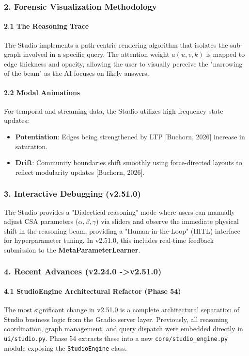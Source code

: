 \subsubsection{2. Forensic Visual\-ization Methodology}

\paragraph{2.1 The Reasoning Trace}
The Studio implements a path-centric rendering algorithm that isolates the sub-graph involved in a specific query. The attention weight $a(u,v,k)$ is mapped to edge thickness and opacity, allowing the user to visually perceive the "narrowing of the beam" as the AI focuses on likely answers.

\paragraph{2.2 Modal Animations}
For temporal and streaming data, the Studio utilizes high-frequency state updates:
\begin{itemize}
\item \textbf{Potent\-iation}: Edges being stren\-gthened by LTP [Buchorn, 2026] increase in saturation.
\item \textbf{Drift}: Community boundaries shift smoothly using force-directed layouts to reflect modularity updates [Buchorn, 2026].

\end{itemize}
\subsubsection{3. Interactive Debugging (v2.51.0)}
The Studio provides a "Dialectical reasoning" mode where users can manually adjust CSA parameters ($\alpha, \beta, \gamma$) via sliders and observe the immediate physical shift in the reasoning beam, providing a "Human-in-the-Loop" (HITL) interface for hyper\-parameter tuning. In v2.51.0, this includes real-time feedback submission to the \textbf{MetaParameterLearner}.

\subsubsection{4. Recent Advances (v2.24.0 -\textgreater  v2.51.0)}

\paragraph{4.1 StudioEngine Archit\-ectural Refactor (Phase 54)}
The most significant change in v2.51.0 is a complete archi\-tectural separation of Studio business logic from the Gradio server layer. Previously, all reasoning coord\-ination, graph management, and query dispatch were embedded directly in \texttt{ui/studio.py}. Phase 54 extracts these into a new \texttt{core/studio\_engine.py} module exposing the \texttt{StudioEngine} class.

